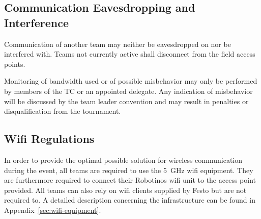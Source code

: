 \documentclass[12pt,twoside]{article}
\newenvironment{rulechange}{}{}
\begin{document}
\subsection{Communication Eavesdropping and Interference}
\label{sec:comm-tampering}
Communication of another team may neither be eavesdropped on nor be
interfered with. Teams not currently active shall disconnect from the
field access points.

Monitoring of bandwidth used or of possible misbehavior may only be
performed by members of the TC or an appointed delegate.
Any indication of misbehavior will be discussed by the team leader
convention and may result in penalties or disqualification from the
tournament.



\subsection{Wifi Regulations}
\label{sec:wifi-regulations}
In order to provide the optimal possible solution for wireless
communication during the event, all teams are required to use the
\SI{5}{\giga\hertz} wifi equipment. They are furthermore required to
connect their Robotinos wifi unit to the access point provided. All
teams can also rely on wifi clients supplied by Festo but are not
required to. A detailed description concerning the infrastructure can
be found in Appendix~\ref{sec:wifi-equipment}.
\end{document}
